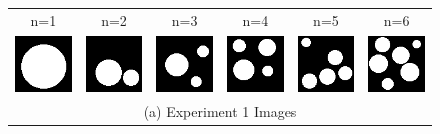 \documentclass[letterpaper]{article} %
\begin{document}
\begin{figure}[!htbp]%
\centering
\footnotesize
\begin{tabular}{cccccc}
\multicolumn{1}{c}{n=1} \hspace{-12pt} &
\multicolumn{1}{c}{n=2} \hspace{-12pt} &
\multicolumn{1}{c}{n=3} \hspace{-12pt} &
\multicolumn{1}{c}{n=4} \hspace{-12pt} &
\multicolumn{1}{c}{n=5} \hspace{-12pt} &
\multicolumn{1}{c}{n=6} \\

\multicolumn{1}{c}{\includegraphics[width=0.125\columnwidth]{images/circle_1.png}} \hspace{-12pt} &  \multicolumn{1}{c}{\includegraphics[width=0.125\columnwidth]{images/circle_2.png}} \hspace{-12pt} & \multicolumn{1}{c}{\includegraphics[width=0.125\columnwidth]{images/circle_3.png}} \hspace{-12pt} & \multicolumn{1}{c}{\includegraphics[width=0.125\columnwidth]{images/circle_4.png}} \hspace{-12pt} & \multicolumn{1}{c}{\includegraphics[width=0.125\columnwidth]{images/circle_5.png}} \hspace{-12pt} & \multicolumn{1}{c}{\includegraphics[width=0.125\columnwidth]{images/circle_6.png}} \\
\multicolumn{6}{c}{(a) Experiment 1 Images} \\


\end{tabular}
\end{figure}
\end{document}
